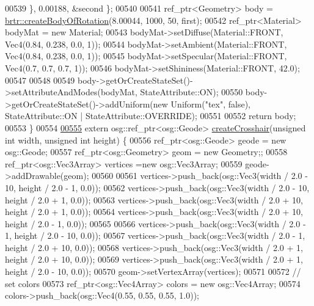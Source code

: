 \begin{DoxyCode}
00539         \}, 0.00188, &second \};
00540 
00541         ref\_ptr<Geometry> body = \hyperlink{namespacebrtr_a83d3e627c9dc247459610aa9fec23d7b}{brtr::createBodyOfRotation}(8.00044, 1000, 50, 
      first);
00542         ref\_ptr<Material> bodyMat = \textcolor{keyword}{new} Material;
00543         bodyMat->setDiffuse(Material::FRONT, Vec4(0.84, 0.238, 0.0, 1));
00544         bodyMat->setAmbient(Material::FRONT, Vec4(0.84, 0.238, 0.0, 1));
00545         bodyMat->setSpecular(Material::FRONT, Vec4(0.7, 0.7, 0.7, 1));
00546         bodyMat->setShininess(Material::FRONT, 42.0);
00547 
00548 
00549         body->getOrCreateStateSet()->setAttributeAndModes(bodyMat, StateAttribute::ON);
00550         body->getOrCreateStateSet()->addUniform(\textcolor{keyword}{new} Uniform(\textcolor{stringliteral}{"tex"}, \textcolor{keyword}{false}), StateAttribute::ON | 
      StateAttribute::OVERRIDE);
00551 
00552         \textcolor{keywordflow}{return} body;
00553     \}
00554 
\hypertarget{_util_functions_8cpp_source_l00555}{}\hyperlink{namespacebrtr_a31c533ae635c528c761cc83e34e91b2f}{00555}     \textcolor{keyword}{extern} osg::ref\_ptr<osg::Geode> \hyperlink{namespacebrtr_a31c533ae635c528c761cc83e34e91b2f}{createCrosshair}(\textcolor{keywordtype}{unsigned} \textcolor{keywordtype}{int} width, \textcolor{keywordtype}{unsigned} \textcolor{keywordtype}{int} height)
       \{
00556         ref\_ptr<osg::Geode>         geode = \textcolor{keyword}{new} osg::Geode;
00557         ref\_ptr<osg::Geometry>    geom = \textcolor{keyword}{new} Geometry;;
00558         ref\_ptr<osg::Vec3Array>   vertices =\textcolor{keyword}{new} osg::Vec3Array;
00559         geode->addDrawable(geom);
00560 
00561         vertices->push\_back(osg::Vec3(width / 2.0 - 10, height / 2.0 - 1, 0.0));
00562         vertices->push\_back(osg::Vec3(width / 2.0 - 10, height / 2.0 + 1, 0.0));
00563         vertices->push\_back(osg::Vec3(width / 2.0 + 10, height / 2.0 + 1, 0.0));
00564         vertices->push\_back(osg::Vec3(width / 2.0 + 10, height / 2.0 - 1, 0.0));
00565 
00566         vertices->push\_back(osg::Vec3(width / 2.0 - 1, height / 2.0 - 10, 0.0));
00567         vertices->push\_back(osg::Vec3(width / 2.0 - 1, height / 2.0 + 10, 0.0));
00568         vertices->push\_back(osg::Vec3(width / 2.0 + 1, height / 2.0 + 10, 0.0));
00569         vertices->push\_back(osg::Vec3(width / 2.0 + 1, height / 2.0 - 10, 0.0));
00570         geom->setVertexArray(vertices);
00571 
00572         \textcolor{comment}{// set colors}
00573         ref\_ptr<osg::Vec4Array> colors = \textcolor{keyword}{new} osg::Vec4Array;
00574         colors->push\_back(osg::Vec4(0.55, 0.55, 0.55, 1.0));

\end{DoxyCode}
